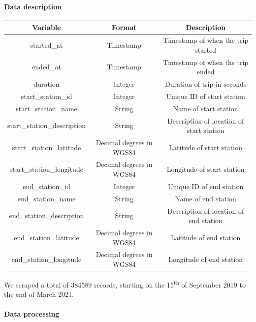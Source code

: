 \documentclass[11pt,a4paper]{article}
\begin{document}
\paragraph{Data description} %
\begin{center}
\begin{tabular}{ ||c|c|c|| } 
 \hline
 Variable & Format & Description\\ [0.5ex] 
 \hline \hline
 started\_at & Timestamp & Timestamp of when the trip started\\ 
 \hline
 ended\_at & Timestamp & Timestamp of when the trip ended \\ 
 \hline
 duration & Integer & Duration of trip in seconds \\ 
 \hline
 start\_station\_id & Integer & Unique ID of start station \\
 \hline
 start\_station\_name & String & Name of start station \\
 \hline
 start\_station\_description & String & Description of location of start station \\
 \hline
 start\_station\_latitude & Decimal degrees in WGS84 & Latitude of start station\\
 \hline
 start\_station\_longitude & Decimal degrees in WGS84 & Longitude of start station\\
 \hline
 end\_station\_id & Integer & Unique ID of end station\\
 \hline
 end\_station\_name & String & Name of end station\\
 \hline
end\_station\_description & String & Description of location of end station \\
\hline
end\_station\_latitude & Decimal degrees in WGS84 & Latitude of end station\\
\hline
end\_station\_longitude & Decimal degrees in WGS84 & Longitude of end station\\
 \hline
\end{tabular}
\end{center} 
%
We scraped a total of 384589 records, starting on the 15\textsuperscript{th} of September 2019 to the end of March 2021. 
\vspace{-4mm}

\paragraph{Data processing} %
\end{document}
